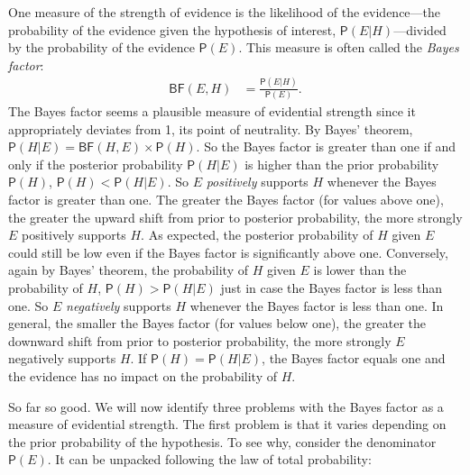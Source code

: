 \documentclass[
  10pt,
  dvipsnames,enabledeprecatedfontcommands]{scrartcl}
\newcommand{\pr}[1]{\mathsf{P}(#1)}
\begin{document}
One measure of the strength of evidence is the likelihood of the
evidence---the probability of the evidence given the hypothesis of
interest, \(\pr{E \vert H}\)---divided by the probability of the
evidence \(\pr{E}\). This measure is often called the
\emph{Bayes factor}: \begin{align}\label{eq:BF}
\tag{BF}
\mathsf{BF}(E,H) & = \frac{\pr{E \vert H}}{\pr{E}}.
\end{align} \noindent The Bayes factor seems a plausible measure of
evidential strength since it appropriately deviates from 1, its point of
neutrality. By Bayes' theorem,
\(\pr{H \vert E} = \mathsf{BF}(H, E) \times \pr{H}\). So the Bayes
factor is greater than one if and only if the posterior probability
\(\pr{H \vert E}\) is higher than the prior probability \(\pr{H}\),
\(\pr{H}<\pr{H\vert E}\). So \(E\) \textit{positively} supports \(H\)
whenever the Bayes factor is greater than one. The greater the Bayes
factor (for values above one), the greater the upward shift from prior
to posterior probability, the more strongly \(E\) positively supports
\(H\). As expected, the posterior probability of \(H\) given \(E\) could
still be low even if the Bayes factor is significantly above one.
Conversely, again by Bayes' theorem, the probability of \(H\) given
\(E\) is lower than the probability of \(H\), \(\pr{H}>\pr{H\vert E}\)
just in case the Bayes factor is less than one. So \(E\)
\textit{negatively} supports \(H\) whenever the Bayes factor is less
than one. In general, the smaller the Bayes factor (for values below
one), the greater the downward shift from prior to posterior
probability, the more strongly \(E\) negatively supports \(H\). If
\(\pr{H}=\pr{H\vert E}\), the Bayes factor equals one and the evidence
has no impact on the probability of \(H\).

So far so good. We will now identify three problems with the Bayes
factor as a measure of evidential strength. The first problem is that it
varies depending on the prior probability of the hypothesis. To see why,
consider the denominator \(\pr{E}\). It can be unpacked following the
law of total probability:

\vspace{-3mm}
\end{document}
